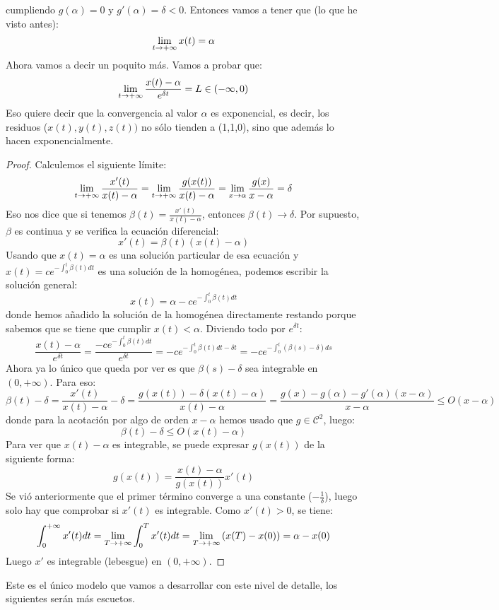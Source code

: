 cumpliendo $g(\alpha)=0$ y $g'(\alpha)=\delta<0$. Entonces vamos a tener que (lo que he visto antes):
\[
\displaystyle\lim_{  t  \to +\infty }  x(t) =\alpha
\]
Ahora vamos a decir un poquito más. Vamos a probar que:
\[
\displaystyle\lim_{  t  \to +\infty }  \frac{x(t)-\alpha}{e^{\delta t}} =L\in(-\infty,0)
\]
Eso quiere decir que la convergencia al valor $\alpha$ es exponencial, es decir, los residuos ($x(t),y(t),z(t))$ no sólo tienden a (1,1,0), sino que además lo hacen exponencialmente.
\begin{proof}
Calculemos el siguiente límite:
\[
\displaystyle\lim_{  t  \to +\infty }  \frac{x'(t)}{x(t)-\alpha} =\displaystyle\lim_{  t  \to +\infty }  \frac {g(x(t))}{x(t)-\alpha}=\displaystyle\lim_{ x \to \alpha } \frac{g(x)}{x-\alpha}=\delta
\]
Eso nos dice que si tenemos $\beta(t)=\frac{x'(t)}{x(t)-\alpha}$, entonces $\beta(t)\longrightarrow \delta$. Por supuesto, $\beta$ es continua y se verifica la ecuación diferencial:
\[
x'(t)= \beta(t)(x(t)-\alpha)
\]
Usando que $x(t)=\alpha$ es una solución particular de esa ecuación y $x(t)=ce^{-\int_0^t\beta(t)dt}$ es una solución de la homogénea, podemos escribir la solución general:
\[
x(t)=\alpha-ce^{-\int_0^t\beta(t)dt}
\]
donde hemos añadido la solución de la homogénea directamente restando porque sabemos que se tiene que cumplir $x(t)<\alpha$. Diviendo todo por $e^{\delta t}$:
\[
\frac{x(t)-\alpha}{e^{\delta t}}=\frac{-ce^{-\int_0^t\beta(t)dt}}{e^{\delta t}}=-ce^{-\int_0^t\beta(t)dt-\delta t}=-ce^{-\int_0^t\left(\beta(s)-\delta \right)ds}
\]
Ahora ya lo único que queda por ver es que $\beta(s)-\delta$ sea integrable en $(0,+\infty)$. Para eso:
\[
\beta(t)-\delta=\frac{x'(t)}{x(t)-\alpha}-\delta=\frac{g(x(t))-\delta(x(t)-\alpha)}{x(t)-\alpha}=\frac{g(x)-g(\alpha)-g'(\alpha)(x-\alpha) }{x-\alpha}\leq O(x-\alpha)
\]
donde para la acotación por algo de orden $x-\alpha$ hemos usado que $g\in\mathcal{C}^2$, luego:
\[
\beta(t)-\delta\leq O(x(t)-\alpha)
\]
Para ver que $x(t)-\alpha$ es integrable, se puede expresar $g(x(t))$ de la siguiente forma:
\[
g(x(t))=\frac{x(t)-\alpha}{g(x(t))}x'(t)
\]
Se vió anteriormente que el primer término converge a una constante ($-\frac{1}{\delta}$), luego solo hay que comprobar si $x'(t)$ es integrable. Como $x'(t)>0$, se tiene:
\[
\displaystyle\int_{ 0 }^{ +\infty } x'(t)dt=\displaystyle\lim_{  T  \to +\infty }  \displaystyle\int_{ 0 }^{ T } x'(t)dt =
\displaystyle\lim_{  T  \to +\infty }  \left(x(T)-x(0)\right) =\alpha-x(0)
\]
Luego $x'$ es integrable (lebesgue) en $(0,+\infty)$.
\end{proof}

Este es el único modelo que vamos a desarrollar con este nivel de detalle, los siguientes serán más escuetos.

